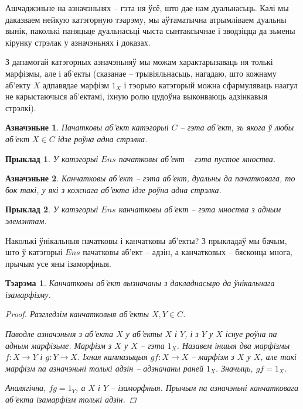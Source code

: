 \documentclass[a4paper,12pt]{book}
\newtheorem{theorem}{Тэарэма}[section]
\newtheorem{example}{Прыклад}[section]
\newtheorem{definition}{Азначэньне}[section]
\begin{document}
Ашчаджэньне на азначэньнях -- гэта ня ўсё, што дае нам
дуальнасьць. Калі мы даказваем нейкую катэгорную тэарэму, мы
аўтаматычна атрымліваем дуальны вынік, паколькі паняцьце дуальнасьці
чыста сынтаксычнае і зводзіцца да зьмены кірунку стрэлак у азначэньнях
і доказах.

З дапамогай катэгорных азначэньняў мы можам характарызаваць ня толькі
марфізмы, але і аб'екты (сказанае -- трывіяльнасьць, нагадаю, што
кожнаму аб'екту $X$ адпавядае марфізм $1_X$ і тэорыю катэгорый можна
сфармуляваць наагул не карыстаючыся аб'ектамі, іхную ролю цудоўна
выконваюць адзінкавыя стрэлкі).

\begin{definition}
  Пачатковы аб'ект катэгорыі $C$ -- гэта аб'ект, зь якога ў любы
  аб'ект $X \in C$ ідзе роўна адна стрэлка.
\end{definition}

\begin{example}
  У катэгорыі $Ens$ пачатковы аб'ект -- гэта пустое мноства.
\end{example}

\begin{definition}
  Канчатковы аб'ект -- гэта аб'ект, дуальны да пачатковага, то бок
  такі, у які з кожнага аб'екта ідзе роўна адна стрэлка.
\end{definition}

\begin{example}
  У катэгорыі $Ens$ канчатковы аб'ект -- гэта мноства з адным элемэнтам.
\end{example}

Наколькі ўнікальныя пачатковы і канчатковы аб'екты? З прыкладаў мы
бачым, што ў катэгорыі $Ens$ пачатковы аб'ект -- адзін, а канчатковых
-- бясконца многа, прычым усе яны ізаморфныя.

\begin{theorem}
  Канчатковы аб'ект вызначаны з дакладнасьцю да ўнікальнага
  ізамарфізму.
  \begin{proof}
    Разгледзім канчатковыя аб'екты $X, Y \in C$.

    Паводле азначэньня з
    аб'екта $X$ у аб'екты $X$ і $Y$, і з $Y$ у $X$ існуе роўна па адным
    марфізьме. Марфізм з $X$ у $X$ -- гэта $1_X$. Назавем іншыя два
    марфізмы $f: X \rightarrow Y$ і $g:Y \rightarrow X$. Іхная
    кампазыцыя $gf: X \rightarrow X$ -- марфізм з $X$ у $X$, але такі
    марфізм па азначэньні толькі адзін -- адзначаны раней
    $1_X$. Значыць, $gf = 1_X$.

    Аналягічна, $fg = 1_Y$, а $X$ і $Y$ -- ізаморфныя. Прычым па
    азначэньні канчатковага аб'екта ізамарфізм толькі адзін.
  \end{proof}
\end{theorem}
\end{document}
